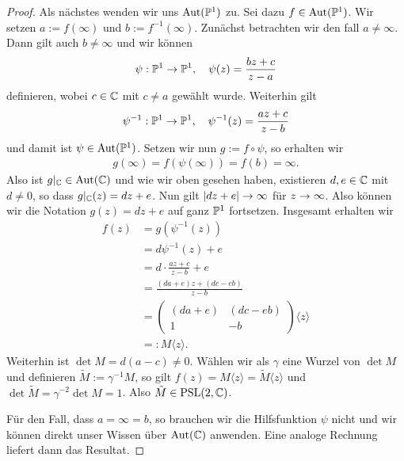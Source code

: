 \begin{proof}
  Als nächstes wenden wir uns $\Aut(\P^1)$ zu. Sei dazu $f \in
  \Aut(\P^1)$. Wir setzen $a:= f(\infty)$ und $b :=
  f^{-1}(\infty)$. Zunächst betrachten wir den fall $a \neq
  \infty$. Dann gilt auch $b \neq \infty$ und wir können
  \[
  \psi: \P^1 \ra \P^1, \quad \psi(z) = \frac{bz + c}{z - a}
  \]
  definieren, wobei $c \in \C$ mit $c \neq a$ gewählt wurde. Weiterhin gilt
  \[
  \psi^{-1}: \P^1 \ra \P^1, \quad \psi^{-1}(z) = \frac{az +c}{z -b}
  \]
  und damit ist $\psi \in \Aut(\P^1)$. Setzen wir nun $g := f \circ
  \psi$, so erhalten wir
  \begin{align*}
    g(\infty) = f(\psi(\infty)) = f(b) = \infty.
  \end{align*}
  Also ist $g|_\C \in \Aut(\C)$ und wie wir oben gesehen haben,
  existieren $d,e \in \C$ mit $d \neq 0$, so dass $g|_\C(z) = dz +
  e$. Nun gilt $|dz + e| \ra \infty$ für $z \ra \infty$. Also können
  wir die Notation $g(z) = dz+e$ auf ganz $\P^1$ fortsetzen. Insgesamt
  erhalten wir
  \begin{align*}
    f(z) & = g(\psi^{-1}(z)) \\
    & = d\psi^{-1}(z) + e \\
    & = d \cdot \frac{az + c}{z - b} + e \\
    & = \frac{(da + e) z + (dc - eb)}{z - b} \\
    & =
    \begin{pmatrix}
      (da + e) & (dc - eb) \\
      1 & -b
    \end{pmatrix}\langle z \rangle \\
    & =: M\langle z \rangle.
  \end{align*}
  Weiterhin ist $\det M = d( a-c) \neq 0$. Wählen wir als $\gamma$
  eine Wurzel von $\det M$ und definieren $\tilde M := \gamma^{-1} M$,
  so gilt $f(z) = M\langle z \rangle = \tilde M \langle z \rangle$ und
  $\det \tilde M = \gamma^{-2} \det M = 1$. Also $\tilde M \in
  \PSL(2, \C)$.

  Für den Fall, dass $a = \infty = b$, so brauchen wir die
  Hilfsfunktion $\psi$ nicht und wir können direkt unser Wissen über
  $\Aut(\C)$ anwenden. Eine analoge Rechnung liefert dann das
  Resultat.


\end{proof}
